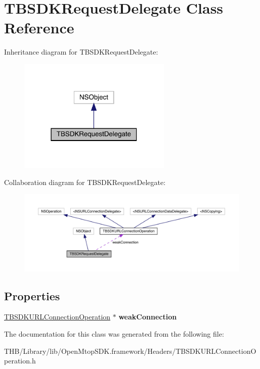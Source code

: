 \hypertarget{interface_t_b_s_d_k_request_delegate}{}\section{T\+B\+S\+D\+K\+Request\+Delegate Class Reference}
\label{interface_t_b_s_d_k_request_delegate}


Inheritance diagram for T\+B\+S\+D\+K\+Request\+Delegate\+:\nopagebreak
\begin{figure}[H]
\begin{center}
\leavevmode
\includegraphics[width=207pt]{interface_t_b_s_d_k_request_delegate__inherit__graph}
\end{center}
\end{figure}


Collaboration diagram for T\+B\+S\+D\+K\+Request\+Delegate\+:\nopagebreak
\begin{figure}[H]
\begin{center}
\leavevmode
\includegraphics[width=350pt]{interface_t_b_s_d_k_request_delegate__coll__graph}
\end{center}
\end{figure}
\subsection*{Properties}
\begin{DoxyCompactItemize}
\item 
\mbox{\label{interface_t_b_s_d_k_request_delegate_afa0c02f9ad7020b045cd971083b225e2}} 
\mbox{\hyperlink{interface_t_b_s_d_k_u_r_l_connection_operation}{T\+B\+S\+D\+K\+U\+R\+L\+Connection\+Operation}} $\ast$ {\bfseries weak\+Connection}
\end{DoxyCompactItemize}


The documentation for this class was generated from the following file\+:\begin{DoxyCompactItemize}
\item 
T\+H\+B/\+Library/lib/\+Open\+Mtop\+S\+D\+K.\+framework/\+Headers/T\+B\+S\+D\+K\+U\+R\+L\+Connection\+Operation.\+h\end{DoxyCompactItemize}
